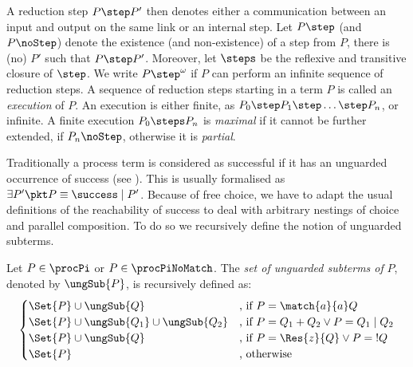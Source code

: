 \documentclass[final,copyright,creativecommons]{eptcs}
\begin{document}
A reduction step $ P \step P' $ then denotes either a communication between an input and output on the same link or an internal step.
Let $ P \step $ (and $ P \noStep $) denote the existence (and non-existence) of a step from $ P $, \ie there is (no) $ P' $ such that $ P \step P' $. Moreover, let $ \steps $ be the reflexive and transitive closure of $ \step $. We write $ P \step^{\omega} $ if $ P $ can perform an infinite sequence of reduction steps. A sequence of reduction steps starting in a term $ P $ is called an \emph{execution} of $ P $. An execution is either finite, as $ P_0 \step P_1 \step \ldots \step P_n $, or infinite. A finite execution $ P_0 \steps P_n $ is \emph{maximal} if it cannot be further extended, \ie if $ P_n \noStep $, otherwise it is \emph{partial}.

Traditionally a process term is considered as successful if it has an unguarded occurrence of success (see \eg \cite{gorla}). This is usually formalised as $ \exists P' \pkt P \equiv \success \mid P' $. Because of free choice, we have to adapt the usual definitions of the reachability of success to deal with arbitrary nestings of choice and parallel composition. To do so we recursively define the notion of unguarded subterms.

\begin{definition}
	\label{def:unguardedSubterms}
	Let $ P \in \procPi $ or $ P \in \procPiNoMatch $. The \emph{set of unguarded subterms of} $ P $, denoted by $ \ungSub{P} $, is recursively defined as:
	\vspace*{-0.6em}
	\begin{align*}
  		\begin{cases}
  			\Set{ P } \cup \ungSub{Q} & \text{, if } P = \match{a}{a}Q\\
  			\Set{ P } \cup \ungSub{Q_1} \cup \ungSub{Q_2} & \text{, if } P = Q_1 + Q_2 \vee P = Q_1 \mid Q_2\\
  			\Set{ P } \cup \ungSub{Q} & \text{, if } P = \Res{z}{Q} \vee P = {!}Q\\
  			\Set{ P } & \text{, otherwise}
  		\end{cases}
	\end{align*}
	\vspace*{-1.1em}
\end{definition}
\end{document}
